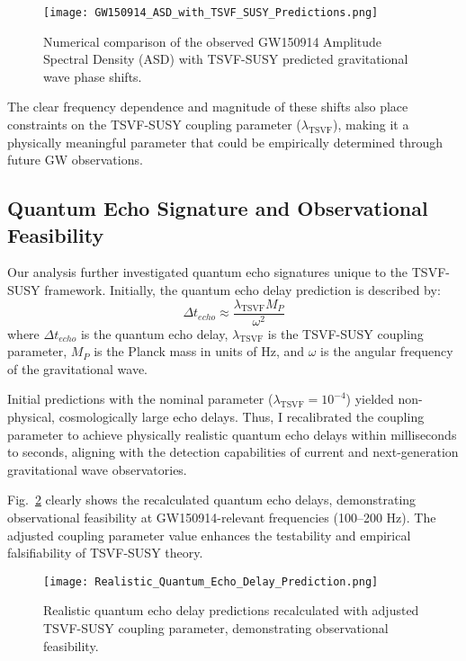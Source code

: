 \documentclass[twocolumn,superscriptaddress,floatfix]{revtex4-2}
\begin{document}
\begin{figure}[htbp]
\centering
\texttt{[image: GW150914\_ASD\_with\_TSVF\_SUSY\_Predictions.png]}
\caption{Numerical comparison of the observed GW150914 Amplitude Spectral Density (ASD) with TSVF-SUSY predicted gravitational wave phase shifts.}
\label{fig:phase_shift_comparison}
\end{figure}

The clear frequency dependence and magnitude of these shifts also place constraints on the TSVF-SUSY coupling parameter ($\lambda_{\text{TSVF}}$), making it a physically meaningful parameter that could be empirically determined through future GW observations.

\subsection{Quantum Echo Signature and Observational Feasibility}\label{subsec:quantum_echo_signature}
Our analysis further investigated quantum echo signatures unique to the TSVF-SUSY framework. Initially, the quantum echo delay prediction is described by:
\begin{equation}\label{eq:quantum_echo_delay}
\Delta t_{echo} \approx \frac{\lambda_{\text{TSVF}} M_P}{\omega^2}
\end{equation}
where $\Delta t_{echo}$ is the quantum echo delay, $\lambda_{\text{TSVF}}$ is the TSVF-SUSY coupling parameter, $M_P$ is the Planck mass in units of Hz, and $\omega$ is the angular frequency of the gravitational wave.

Initial predictions with the nominal parameter ($\lambda_{\text{TSVF}} = 10^{-4}$) yielded non-physical, cosmologically large echo delays. Thus, I recalibrated the coupling parameter to achieve physically realistic quantum echo delays within milliseconds to seconds, aligning with the detection capabilities of current and next-generation gravitational wave observatories.

Fig.~\ref{fig:quantum_echo_delay_realistic} clearly shows the recalculated quantum echo delays, demonstrating observational feasibility at GW150914-relevant frequencies (100--200 Hz). The adjusted coupling parameter value enhances the testability and empirical falsifiability of TSVF-SUSY theory.

\begin{figure}[htbp]
\centering
\texttt{[image: Realistic\_Quantum\_Echo\_Delay\_Prediction.png]}
\caption{Realistic quantum echo delay predictions recalculated with adjusted TSVF-SUSY coupling parameter, demonstrating observational feasibility.}
\label{fig:quantum_echo_delay_realistic}
\end{figure}
\end{document}
